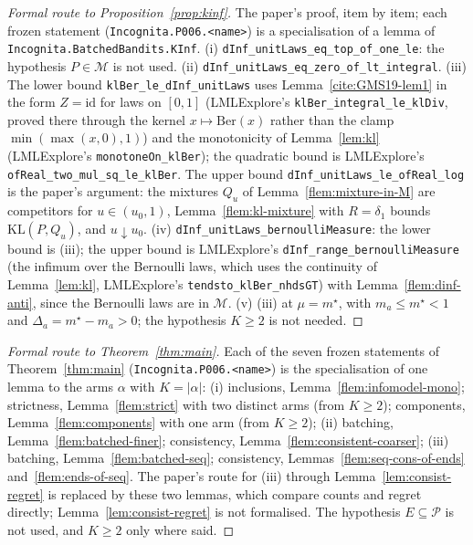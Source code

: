\documentclass[11pt]{article}
\newcommand{\KL}{\mathrm{KL}}
\begin{document}
\begin{proof}[Formal route to Proposition~\ref{prop:kinf}]
The paper's proof, item by item; each frozen statement (\texttt{Incognita.P006.<name>}) is a
specialisation of a lemma of \texttt{Incognita.BatchedBandits.KInf}.
(i) \texttt{dInf\_unitLaws\_eq\_top\_of\_one\_le}: the hypothesis $P\in\mathcal M$ is not used.
(ii) \texttt{dInf\_unitLaws\_eq\_zero\_of\_lt\_integral}.
(iii) The lower bound \texttt{klBer\_le\_dInf\_unitLaws} uses Lemma~\ref{cite:GMS19-lem1} in the
form $Z=\mathrm{id}$ for laws on $[0,1]$ (LMLExplore's \texttt{klBer\_integral\_le\_klDiv}, proved
there through the kernel $x\mapsto\mathrm{Ber}(x)$ rather than the clamp
$\min(\max(x,0),1)$) and the monotonicity of Lemma~\ref{lem:kl} (LMLExplore's
\texttt{monotoneOn\_klBer}); the quadratic bound is LMLExplore's
\texttt{ofReal\_two\_mul\_sq\_le\_klBer}. The upper bound \texttt{dInf\_unitLaws\_le\_ofReal\_log}
is the paper's argument: the mixtures $Q_u$ of Lemma~\ref{flem:mixture-in-M} are competitors for
$u\in(u_0,1)$, Lemma~\ref{flem:kl-mixture} with $R=\delta_1$ bounds $\KL(P,Q_u)$, and
$u\downarrow u_0$.
(iv) \texttt{dInf\_unitLaws\_bernoulliMeasure}: the lower bound is (iii); the upper bound is
LMLExplore's \texttt{dInf\_range\_bernoulliMeasure} (the infimum over the Bernoulli laws, which uses
the continuity of Lemma~\ref{lem:kl}, LMLExplore's \texttt{tendsto\_klBer\_nhdsGT}) with
Lemma~\ref{flem:dinf-anti}, since the Bernoulli laws are in $\mathcal M$.
(v) (iii) at $\mu=m^\star$, with $m_a\le m^\star<1$ and $\Delta_a=m^\star-m_a>0$; the hypothesis
$K\ge2$ is not needed.
\end{proof}

\begin{proof}[Formal route to Theorem~\ref{thm:main}]
Each of the seven frozen statements of Theorem~\ref{thm:main} (\texttt{Incognita.P006.<name>}) is
the specialisation of one lemma to the arms $\alpha$ with $K=|\alpha|$:
(i) inclusions, Lemma~\ref{flem:infomodel-mono}; strictness, Lemma~\ref{flem:strict} with two
distinct arms (from $K\ge2$); components, Lemma~\ref{flem:components} with one arm (from $K\ge2$);
(ii) batching, Lemma~\ref{flem:batched-finer}; consistency, Lemma~\ref{flem:consistent-coarser};
(iii) batching, Lemma~\ref{flem:batched-seq}; consistency, Lemmas~\ref{flem:seq-cons-of-ends}
and~\ref{flem:ends-of-seq}. The paper's route for (iii) through Lemma~\ref{lem:consist-regret} is
replaced by these two lemmas, which compare counts and regret directly; Lemma~\ref{lem:consist-regret}
is not formalised. The hypothesis $E\subseteq\mathcal P$ is not used, and $K\ge2$ only where said.
\end{proof}
\end{document}

